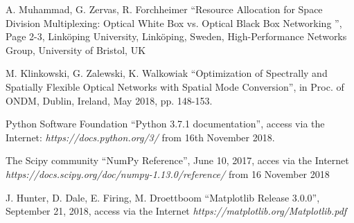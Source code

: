 \documentclass[conference]{IEEEtran}
\begin{document}
\begin{thebibliography}{00}
 A. Muhammad, G. Zervas, R. Forchheimer ``Resource Allocation for Space Division Multiplexing: Optical White Box vs. Optical Black Box Networking '', Page 2-3, Linköping University, Linköping, Sweden, High-Performance Networks Group, University of Bristol, UK

 M. Klinkowski, G. Zalewski, K. Walkowiak ``Optimization of Spectrally and Spatially Flexible Optical Networks with Spatial Mode Conversion'', in Proc. of ONDM, Dublin, Ireland, May 2018, pp. 148-153.

 Python Software Foundation ``Python 3.7.1 documentation'', access via the Internet: \textit{https://docs.python.org/3/} from 16th November 2018.

 The Scipy community ``NumPy Reference'', June 10, 2017, acces via the Internet \textit{https://docs.scipy.org/doc/numpy-1.13.0/reference/} from 16 November 2018

 J. Hunter, D. Dale, E. Firing, M. Droettboom ``Matplotlib Release 3.0.0'', September 21, 2018, access via the Internet \textit{https://matplotlib.org/Matplotlib.pdf}


\end{thebibliography}
\vspace{12pt}
\end{document}
